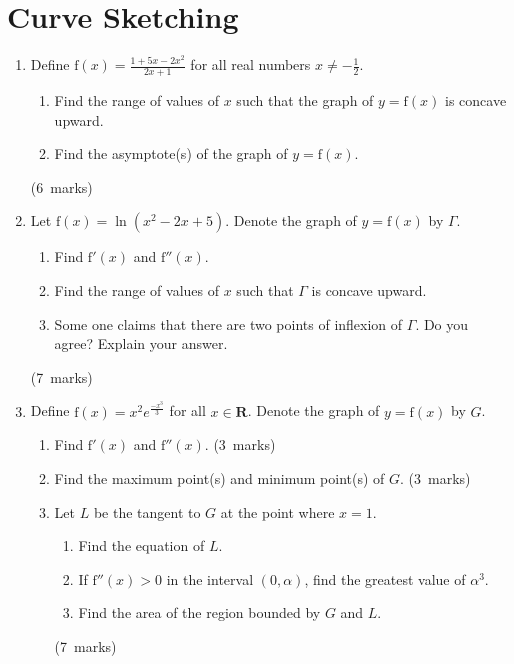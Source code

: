 \documentclass[12pt, a4paper]{article} %
\newcommand{\qmarks}[1]{\leavevmode\unskip\hspace*{\fill}\mbox{(#1 marks)}}
\begin{document}
\section{Curve Sketching}
\begin{enumerate}
    \item Define \(\displaystyle \mathrm{f}(x)=\frac{1+5x-2x^2}{2x+1}\) for all real numbers \(\displaystyle x \neq -\frac{1}{2}\).
    \begin{enumerate}
        \item Find the range of values of \(x\) such that the graph of \(y=\mathrm{f}(x)\) is concave upward.
        \item Find the asymptote(s) of the graph of \(y=\mathrm{f}(x)\).
    \end{enumerate} \qmarks{6}
    
    \item Let \(\displaystyle \mathrm{f}(x)=\ln{(x^2-2x+5)}\). Denote the graph of \(y=\mathrm{f}(x)\) by \(\varGamma\).
    \begin{enumerate}
        \item Find \(\mathrm{f}'(x)\) and \(\mathrm{f}''(x)\).
        \item Find the range of values of \(x\) such that \(\varGamma\) is concave upward.
        \item Some one claims that there are two points of inflexion of \(\varGamma\). Do you  agree? Explain your answer.
    \end{enumerate}\qmarks{7}
    
    \item Define \(\displaystyle \mathrm{f}(x)=x^2e^{\frac{-x^3}{3}}\) for all \(x \in \mathbf{R}\). Denote the graph of \(y=\mathrm{f}(x)\) by \(G\).
    \begin{enumerate}
        \item Find \(\mathrm{f}'(x)\) and \(\mathrm{f}''(x)\). \qmarks{3}
        \item Find the maximum point(s) and minimum point(s) of \(G\). \qmarks{3}
        \item Let \(L\) be the tangent to \(G\) at the point where \(x=1\).
        \begin{enumerate}[label=(\roman*)]
            \item Find the equation of \(L\).
            \item If \(\mathrm{f}''(x)>0\) in the interval \((0,\alpha)\), find the greatest value of \(\alpha^3\).
            \item Find the area of the region bounded by \(G\) and \(L\).
        \end{enumerate} \qmarks{7}
    \end{enumerate}


\end{enumerate}
\end{document}
